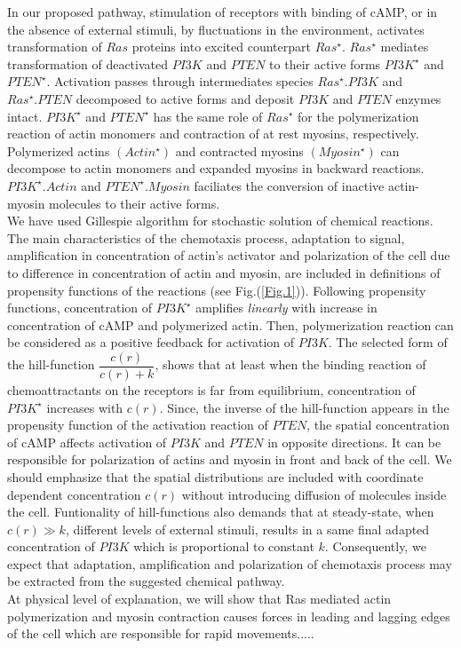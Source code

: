 \documentclass[10pt,letterpaper]{article}
\begin{document}
In our proposed pathway, stimulation of receptors with binding of cAMP, or in the absence of external stimuli,  by fluctuations in the environment, activates transformation of $ Ras $ proteins into excited counterpart $ Ras^{\star}$. $ Ras^{\star} $ mediates transformation of deactivated $ PI3K $ and $ PTEN $ to their active forms $ PI3K^{\star} $ and $ PTEN^{\star} $.  Activation passes through intermediates species $ Ras^{\star}.PI3K $ and $ Ras^{\star}.PTEN $ decomposed to active forms and deposit $ PI3K $ and $ PTEN $ enzymes intact.
 $ PI3K^{\star} $ and $ PTEN^{\star} $ has the same role of $ Ras^{\star}$ for the polymerization reaction of actin monomers and contraction of at rest myosins, respectively. Polymerized actins $(Actin^{\star})$ and contracted myosins $ (Myosin^{\star}) $ can decompose to actin monomers and expanded myosins in backward reactions. $ PI3K^{\star}.Actin $ and $ PTEN^{\star}.Myosin $ faciliates the conversion of inactive actin-myosin molecules to their active forms.\\
We have used Gillespie algorithm for stochastic solution of chemical reactions. The main characteristics of the chemotaxis process, adaptation to signal, amplification in concentration of actin's activator and polarization of the cell due to difference in concentration of actin and myosin, are included in definitions of propensity functions of the reactions (see Fig.(\ref{Fig.1})). Following propensity functions, concentration of $ PI3K^{\star} $ amplifies \textit{linearly} with increase in concentration of cAMP and polymerized actin. Then, polymerization reaction can be considered as a positive feedback for activation of $ PI3K $. The selected form of the hill-function $ \dfrac{c(r)}{c(r)+k} $, shows that at least when the binding reaction of chemoattractants on the receptors is far from equilibrium, concentration of $ PI3K^{\star} $ increases with $ c(r) $.
Since, the inverse of the hill-function  appears in the propensity function of the activation reaction of $ PTEN $, the spatial concentration of cAMP affects activation of $ PI3K $ and $ PTEN $ in opposite directions. It can be responsible for polarization of actins and myosin in front and back of the cell. We should emphasize that the spatial distributions are included with coordinate dependent concentration $ c(r) $ without introducing diffusion of molecules inside the cell.
Funtionality of hill-functions also demands that at steady-state, when $ c(r)\gg k $, different levels of external stimuli, results in a same final adapted concentration of $ PI3K $ which is proportional to constant $ k $. Consequently, we expect that adaptation, amplification and polarization of chemotaxis process may be extracted from the suggested chemical pathway.\\
At physical level of explanation, we will show that Ras mediated actin polymerization and myosin contraction causes forces in leading and lagging edges of the cell which are responsible for rapid movements..... 
\end{document}
